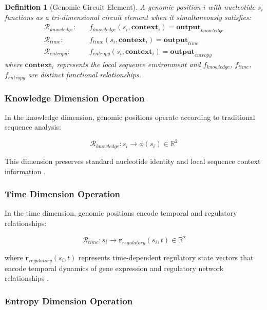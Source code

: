 \documentclass[12pt,a4paper]{article}
\newtheorem{definition}{Definition}
\begin{document}
\begin{definition}[Genomic Circuit Element]
A genomic position $i$ with nucleotide $s_i$ functions as a tri-dimensional circuit element when it simultaneously satisfies:
\begin{align}
\mathcal{R}_{knowledge}: \quad &f_{knowledge}(s_i, \mathbf{context}_i) = \mathbf{output}_{knowledge} \\
\mathcal{R}_{time}: \quad &f_{time}(s_i, \mathbf{context}_i) = \mathbf{output}_{time} \\
\mathcal{R}_{entropy}: \quad &f_{entropy}(s_i, \mathbf{context}_i) = \mathbf{output}_{entropy}
\end{align}
where $\mathbf{context}_i$ represents the local sequence environment and $f_{knowledge}$, $f_{time}$, $f_{entropy}$ are distinct functional relationships.
\end{definition}

\subsubsection{Knowledge Dimension Operation}

In the knowledge dimension, genomic positions operate according to traditional sequence analysis:

\begin{equation}
\mathcal{R}_{knowledge}: s_i \rightarrow \phi(s_i) \in \mathbb{R}^2
\end{equation}

This dimension preserves standard nucleotide identity and local sequence context information \cite{altschul1990basic}.

\subsubsection{Time Dimension Operation}

In the time dimension, genomic positions encode temporal and regulatory relationships:

\begin{equation}
\mathcal{R}_{time}: s_i \rightarrow \mathbf{r}_{regulatory}(s_i, t) \in \mathbb{R}^2
\end{equation}

where $\mathbf{r}_{regulatory}(s_i, t)$ represents time-dependent regulatory state vectors that encode temporal dynamics of gene expression and regulatory network relationships \cite{spitz2012regulatory}.

\subsubsection{Entropy Dimension Operation}
\end{document}
